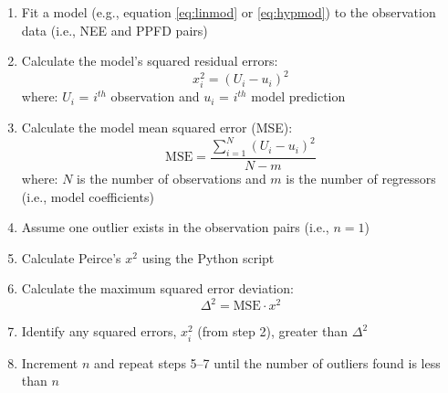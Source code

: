 \begin{enumerate}
    \item Fit a model (e.g., equation \ref{eq:linmod} or \ref{eq:hypmod}) to
          the observation data (i.e., NEE and PPFD pairs)
    \item Calculate the model's squared residual errors:\\
          \begin{equation}
          \label{eq:residerr}
              x_{i}^{2} = (U_{i}-u_{i})^{2}
          \end{equation}
          where: $U_{i}$ = $i^{th}$ observation and $u_{i}$ = $i^{th}$ model 
          prediction
    \item Calculate the model mean squared error (MSE):\\
          \begin{equation}
          \label{eq:mse}
              \text{MSE} = \frac{\sum_{i=1}^{N}(U_{i}-u_{i})^{2}}{N-m}
          \end{equation}
          where: $N$ is the number of observations and $m$ is the number of 
          regressors (i.e., model coefficients)
    \item Assume one outlier exists in the observation pairs (i.e., $n=1$)
    \item Calculate Peirce's $x^{2}$ using the Python script
    \item Calculate the maximum squared error deviation:\\
          \begin{equation}
          \label{eq:delta2}
              \Delta^{2} = \text{MSE}\cdot x^{2}
          \end{equation}
    \item Identify any squared errors, $x_{i}^{2}$ (from step 2), greater than 
          $\Delta^{2}$
    \item Increment $n$ and repeat steps 5--7 until the number of outliers 
          found is less than $n$
\end{enumerate}


